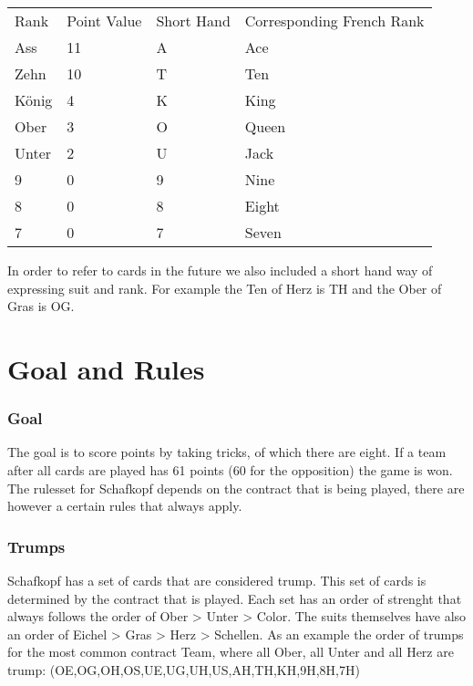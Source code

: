 \begin{table}[]
    \begin{tabular}{llll}
        Rank  & Point Value & Short Hand & Corresponding French Rank \\
        Ass   & 11          & A          & Ace                       \\
        Zehn  & 10          & T          & Ten                       \\
        König & 4           & K          & King                      \\
        Ober  & 3           & O          & Queen                     \\
        Unter & 2           & U          & Jack                      \\
        9     & 0           & 9          & Nine                      \\
        8     & 0           & 8          & Eight                     \\
        7     & 0           & 7          & Seven
    \end{tabular}\label{tab:table}
\end{table}
In order to refer to cards in the future we also included a short hand way of expressing suit and rank.
For example the Ten of Herz is TH and the Ober of Gras is OG.


\section{Goal and Rules}
\subsubsection{Goal}
The goal is to score points by taking tricks, of which there are eight.
If a team after all cards are played has 61 points (60 for the opposition) the game is won.
The rulesset for Schafkopf depends on the contract that is being played, there are however a certain rules that
always apply.
\subsubsection{Trumps}
Schafkopf has a set of cards that are considered trump.
This set of cards is determined by the contract that is played.
Each set has an order of strenght that always follows the order of Ober > Unter > Color.
The suits themselves have also an order of Eichel > Gras > Herz > Schellen.
As an example the order of trumps for the most common contract Team, where all Ober, all Unter and all Herz are trump:
(OE,OG,OH,OS,UE,UG,UH,US,AH,TH,KH,9H,8H,7H)
